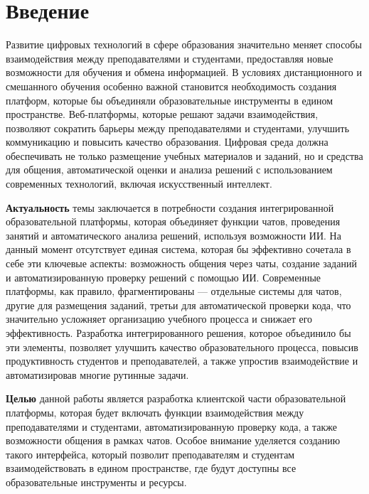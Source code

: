 \newpage
{}
\section*{Введение}

Развитие цифровых технологий в сфере образования значительно меняет способы взаимодействия между преподавателями и студентами, предоставляя новые возможности для обучения и обмена информацией. В условиях дистанционного и смешанного обучения особенно важной становится необходимость создания платформ, которые бы объединяли образовательные инструменты в едином пространстве. Веб-платформы, которые решают задачи взаимодействия, позволяют сократить барьеры между преподавателями и студентами, улучшить коммуникацию и повысить качество образования. Цифровая среда должна обеспечивать не только размещение учебных материалов и заданий, но и средства для общения, автоматической оценки и анализа решений с использованием современных технологий, включая искусственный интеллект.

\textbf{Актуальность} темы заключается в потребности создания интегрированной образовательной платформы, которая объединяет функции чатов, проведения занятий и автоматического анализа решений, используя возможности ИИ. На данный момент отсутствует единая система, которая бы эффективно сочетала в себе эти ключевые аспекты: возможность общения через чаты, создание заданий и автоматизированную проверку решений с помощью ИИ. Современные платформы, как правило, фрагментированы — отдельные системы для чатов, другие для размещения заданий, третьи для автоматической проверки кода, что значительно усложняет организацию учебного процесса и снижает его эффективность. Разработка интегрированного решения, которое объединило бы эти элементы, позволяет улучшить качество образовательного процесса, повысив продуктивность студентов и преподавателей, а также упростив взаимодействие и автоматизировав многие рутинные задачи.

\textbf{Целью} данной работы является разработка клиентской части образовательной платформы, которая будет включать функции взаимодействия между преподавателями и студентами, автоматизированную проверку кода, а также возможности общения в рамках чатов. Особое внимание уделяется созданию такого интерфейса, который позволит преподавателям и студентам взаимодействовать в едином пространстве, где будут доступны все образовательные инструменты и ресурсы.

